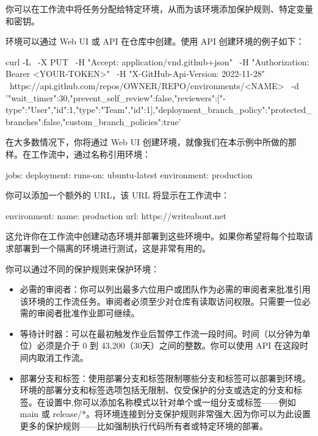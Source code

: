 
你可以在工作流中将任务分配给特定环境，从而为该环境添加保护规则、特定变量和密钥。


环境可以通过 Web UI 或 API 在仓库中创建。使用 API 创建环境的例子如下：

\begin{shell}
curl -L \
  -X PUT \
  -H "Accept: application/vnd.github+json" \
  -H "Authorization: Bearer <YOUR-TOKEN>" \
  -H "X-GitHub-Api-Version: 2022-11-28" \
  https://api.github.com/repos/OWNER/REPO/environments/<NAME> \
  -d '{"wait_timer":30,"prevent_self_review":false,"reviewers":[{"-type":"User","id":1},{"type":"Team","id":1}],"deployment_branch_policy":{"protected_branches":false,"custom_branch_policies":true}}'
\end{shell}

在大多数情况下，你将通过 Web UI 创建环境，就像我们在本示例中所做的那样。在工作流中，通过名称引用环境：

\begin{shell}
jobs:
  deployment:
    runs-on: ubuntu-latest
    environment: production
\end{shell}

你可以添加一个额外的 URL，该 URL 将显示在工作流中：

\begin{shell}
environment:
  name: production
  url: https://writeabout.net
\end{shell}

这允许你在工作流中创建动态环境并部署到这些环境中。如果你希望将每个拉取请求部署到一个隔离的环境进行测试，这是非常有用的。

你可以通过不同的保护规则来保护环境：

\begin{itemize}
\item 
必需的审阅者：你可以列出最多六位用户或团队作为必需的审阅者来批准引用该环境的工作流任务。审阅者必须至少对仓库有读取访问权限。只需要一位必需的审阅者批准作业即可继续。

\item 
等待计时器：可以在最初触发作业后暂停工作流一段时间。时间（以分钟为单位）必须是介于 0 到 43,200（30天）之间的整数。你可以使用 API 在这段时间内取消工作流。

\item 
部署分支和标签：使用部署分支和标签限制哪些分支和标签可以部署到环境。环境的部署分支和标签选项包括无限制、仅受保护的分支或选定的分支和标签。在设置中,你可以添加名称模式以针对单个或一组分支或标签——例如 main 或 release/*。将环境连接到分支保护规则非常强大,因为你可以为此设置更多的保护规则——比如强制执行代码所有者或特定环境的部署。
\end{itemize}

